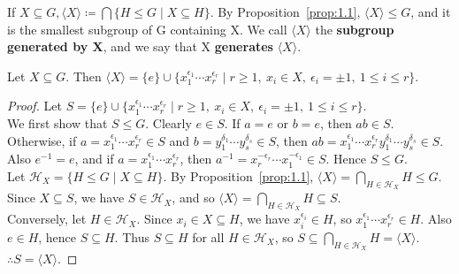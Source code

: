 \documentclass[../Odyssey_Project.tex]{subfiles}
\begin{document}
\smallskip
\noindent If \(X \subseteq G, \langle X \rangle \coloneqq \bigcap \{ H \leq G \mid X \subseteq H \}\). By Proposition~\ref{prop:1.1}, \(\langle X \rangle \leq G\), and it is the smallest subgroup of G containing X. We call \(\langle X \rangle\) the \textbf{subgroup generated by X}, and we say that X \textbf{generates} \(\langle X \rangle\).
\smallskip
\begin{proposition}
\label{prop:1.2}
Let \(X \subseteq G\). Then \(\langle X \rangle = \{e\} \cup \{x_1^{\epsilon_1} \cdots x_r^{\epsilon_r} \mid r \geq 1,\ x_i \in X,\ \epsilon_i = \pm 1,\ 1 \leq i \leq r\}\).
\end{proposition}
\begin{proof}
    Let \(S = \{e\} \cup \{x_1^{\epsilon_1} \cdots x_r^{\epsilon_r} \mid r \geq 1,\ x_i \in X,\ \epsilon_i = \pm 1,\ 1 \leq i \leq r\}\). \\
    We first show that \(S \leq G\). Clearly \(e \in S\).
    If \(a = e\) or \(b = e\), then \(ab \in S\).
    Otherwise, if \(a = x_1^{\epsilon_1} \cdots x_r^{\epsilon_r} \in S\) and \(b = y_1^{\delta_1} \cdots y_s^{\delta_s} \in S\), then \(ab = x_1^{\epsilon_1} \cdots x_r^{\epsilon_r} y_1^{\delta_1} \cdots y_s^{\delta_s} \in S\).
    Also \(e^{-1} = e\), and if \(a = x_1^{\epsilon_1} \cdots x_r^{\epsilon_r}\), then \(a^{-1} = x_r^{-\epsilon_r} \cdots x_1^{-\epsilon_1} \in S\).
    Hence \(S \leq G\). \\
    Let \(\mathcal{H}_X = \{H \leq G \mid X \subseteq H\}\).
    By Proposition~\ref{prop:1.1}, \(\langle X \rangle = \bigcap_{H \in \mathcal{H}_X} H \leq G\). 
    Since \(X \subseteq S\), we have \(S \in \mathcal{H}_X\), and so \(\langle X \rangle = \bigcap_{H \in \mathcal{H}_X} H \subseteq S\). \\
    Conversely, let \(H \in \mathcal{H}_X\).
    Since \(x_i \in X \subseteq H\), we have \(x_i^{\epsilon_i} \in H\), so \(x_1^{\epsilon_1} \cdots x_r^{\epsilon_r} \in H\).
    Also \(e \in H\), hence \(S \subseteq H\).
    Thus \(S \subseteq H\) for all \(H \in \mathcal{H}_X\), so \(S \subseteq \bigcap_{H \in \mathcal{H}_X} H = \langle X \rangle\). \\
    \(\therefore S = \langle X \rangle\).
\end{proof}
\end{document}

